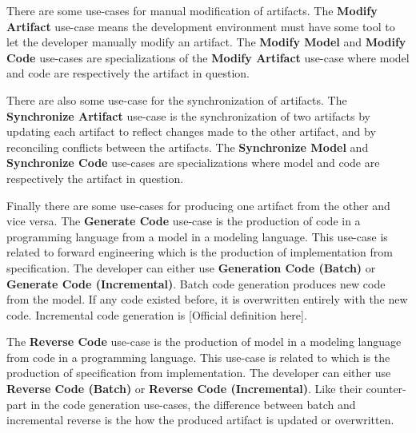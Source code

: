 There are some use-cases for manual modification of artifacts. The \textbf{Modify Artifact} use-case
means the development environment must have some tool to let the developer manually modify an artifact.
The \textbf{Modify Model} and \textbf{Modify Code} use-cases are specializations of the \textbf{Modify Artifact}
use-case where model and code are respectively the artifact in question.

There are also some use-case for the synchronization of artifacts. The \textbf{Synchronize Artifact} use-case
is the synchronization of two artifacts by updating each artifact to reflect changes made to the other artifact,
and by reconciling conflicts between the artifacts. The \textbf{Synchronize Model} and \textbf{Synchronize Code}
use-cases are specializations where model and code are respectively the artifact in question.

Finally there are some use-cases for producing one artifact from the other and vice versa.
The \textbf{Generate Code} use-case is the production of code in a programming language from a model in a modeling language.
This use-case is related to forward engineering \cite{forward_engineering_ref} which is the production
of implementation from specification.
The developer can either use \textbf{Generation Code (Batch)} or \textbf{Generate Code (Incremental)}. Batch
code generation produces new code from the model. If any code existed before, it is overwritten entirely with
the new code. Incremental code generation is [Official definition here].

The \textbf{Reverse Code} use-case is the production of model in a modeling language from code in a programming language.
This use-case is related to \cite{reverse_engineering_ref} which is the production of specification from implementation.
The developer can either use \textbf{Reverse Code (Batch)} or \textbf{Reverse Code (Incremental)}.
Like their counter-part in the code generation use-cases, the difference between batch and
incremental reverse is the how the produced artifact is updated or overwritten.
